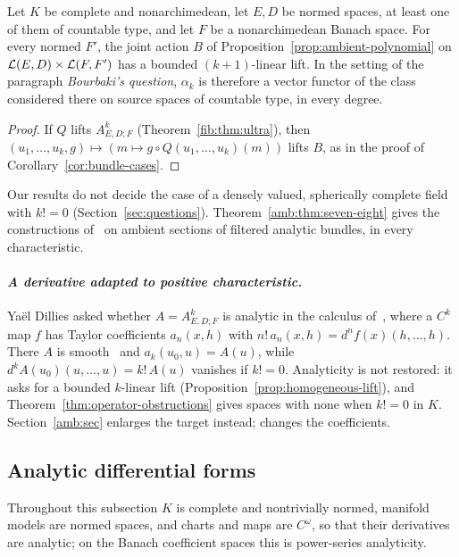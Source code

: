 \begin{corollary}\label{fib:cor:bourbaki}
Let $K$ be complete and nonarchimedean, let $E,D$ be normed spaces, at least one of them of countable type, and let
$F$ be a nonarchimedean Banach space. For every normed $F'$, the joint action $B$ of
Proposition~\ref{prop:ambient-polynomial} on $\mathcal L(E,D)\times\mathcal L(F,F')$ has a bounded $(k+1)$\nobreakdash-linear lift.
In the setting of the paragraph \emph{Bourbaki's question}, $\alpha_k$ is therefore a
vector functor of the class considered there on source spaces of countable type, in every degree.
\end{corollary}

\begin{proof}
If $Q$ lifts $A^k_{E,D;F}$ (Theorem~\ref{fib:thm:ultra}), then $(u_1,\dots,u_k,g)\mapsto(m\mapsto g\circ Q(u_1,\dots,u_k)(m))$
lifts $B$, as in the proof of Corollary~\ref{cor:bundle-cases}.
\end{proof}

Our results do not decide the case of a densely valued, spherically complete field with $k!=0$ (Section~\ref{sec:questions}). Theorem~\ref{amb:thm:seven-eight} gives the constructions of~\cite[n\textsuperscript{o}~7.8.1--7.8.4]{Bou} on ambient sections of filtered analytic bundles, in every characteristic.

\paragraph{\textit{A derivative adapted to positive characteristic.}}
Ya\"el Dillies asked whether $A=A^k_{E,D;F}$ is analytic in the calculus of~\cite[Definition~4.7 and Theorem~5.4]{BGN}, where a $C^k$ map $f$ has Taylor coefficients $a_n(x,h)$ with $n!\,a_n(x,h)=d^nf(x)(h,\ldots,h)$. There $A$ is smooth~\cite[Remark~4.2 and Lemma~10.1]{BGN} and $a_k(u_0,u)=A(u)$, while $d^kA(u_0)(u,\ldots,u)=k!\,A(u)$ vanishes if $k!=0$. Analyticity is not restored: it asks for a bounded $k$-linear lift (Proposition~\ref{prop:homogeneous-lift}), and Theorem~\ref{thm:operator-obstructions} gives spaces with none when $k!=0$ in $K$. Section~\ref{amb:sec} enlarges the target instead; \cite{II} changes the coefficients.

\subsection{Analytic differential forms}\label{sec:forms}

Throughout this subsection $K$ is complete and nontrivially normed, manifold models are normed spaces, and charts and maps are $C^\omega$, so that their derivatives are analytic; on the Banach coefficient spaces this is power-series analyticity.

